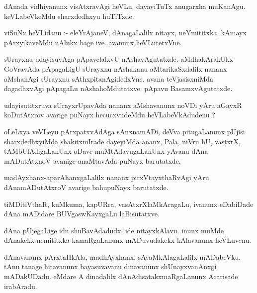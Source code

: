 \documentclass{article}
\begin{document}
\begin{mn}
dAnada vidhiyanunx visAtxravAgi heVLu.  dayaviTuTx anugarxha muKanAgu.  
keVLabeVkeMdu sharxdedhxyu huTiTxde.
\end{mn}

\begin{mn}
viSuNx heVLidanu :- eleYrAjaneV, dAnagaLalilx nitayx, neYmititxka, kAmayx 
pArxyikaveMdu nAlukx bage ive.  avanunx heVLutetxVne.
\end{mn}

\begin{mn}
sUrayxnu udayisuvAga pApavelalxvU nAshavAgutatxde.  aMdhakArakUkx GoVravAda pApagaLigU 
sUrayxnu nAshakanu  aMtarikaSxdalilx nananx aMshanAgi sUrayxnu  sAthxpitanAgidedxVne.  
avana teVjasisxniMda dagadhxvAgi pApagaLu nAshahoMdutatxve.  pApavu BasamxvAgutatxde.
\end{mn}

\begin{mn}
udayisutitxruva  sUrayxrUpavAda nananx aMshavanunx noVDi yAru aGayxR koDutAtxrov 
avarige puNayx  hecucxvudeMdu heVLabeVkAdudenu ?
\end{mn}

\begin{mn}
oLeLxya veVLeyu  pArxpatxvAdAga sAnxnamADi, deVva pitugaLanunx pUjisi sharxdedhxyiMda 
shakitxmIrade  dayeyiMda  ananx, Pala, niVru hU, vastxrX, tAMbUlAdigaLanUnx   
oDave muMtAdavugaLanUnx  yAvanu dAna mADutAtxnoV avanige anaMtavAda puNayx barutatxde,
\end{mn}

\begin{mn}
madAyxhanx-aparAhanxgaLalilx  nananx pirxVtayxthaRvAgi  yAru dAnamADutAtxroV avarige bahupuNayx barutatxde.
\end{mn}

\begin{mn}
tiMDitiVthaR, kuMkuma, kapURra,  vasAtxrXlaMkAragaLu,  ivanunx eDabiDade  
dAna mADidare  BUVgaswKayxgaLu laBisutatxve.
\end{mn}

\begin{mn}
dAna pUjegaLige idu shuBavAdadudx.  ide nitayxkAlavu.  inunx muMde dAnakekx  
nemititxka kamaRgaLanunx  mADuvudakekx kAlavanunx heVLuvenu.
\end{mn}

\begin{mn}
dAnavanunx  pArxtaHkAla, madhAyxhanx, sAyaMkAlagaLalilx mADabeVku.  tAnu tanage 
hitavanunx bayasuvavanu dinavanunx  shUnayxvanAnxgi  mADakUDadu. eMdare  
A dinadalilx  dAnAdisatakxmaRgaLanunx  Acarisade irabAradu.
\end{mn}
\end{document}
